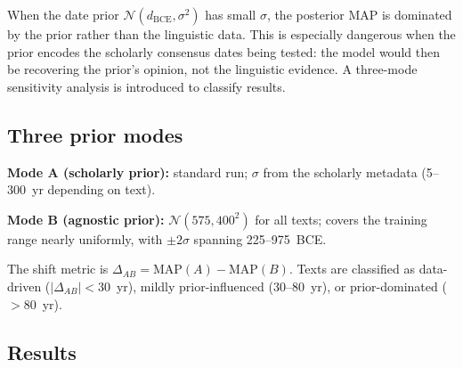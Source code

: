 \documentclass[10pt,letterpaper]{article}
\begin{document}
When the date prior $\mathcal{N}(d_{\text{BCE}}, \sigma^2)$ has small $\sigma$,
the posterior MAP is dominated by the prior rather than the linguistic data.
This is especially dangerous when the prior encodes the scholarly consensus
dates being tested: the model would then be recovering the prior's opinion,
not the linguistic evidence.  A three-mode sensitivity analysis is
introduced to classify results.

\subsection*{Three prior modes}

\textbf{Mode A (scholarly prior):} standard run; $\sigma$ from the
scholarly metadata (5--300~yr depending on text).

\textbf{Mode B (agnostic prior):} $\mathcal{N}(575, 400^2)$ for all texts;
covers the training range nearly uniformly, with $\pm 2\sigma$ spanning
225--975~BCE.

The shift metric is $\Delta_{AB} = \text{MAP}(A) - \text{MAP}(B)$.
Texts are classified as data-driven ($|\Delta_{AB}| < 30$~yr), mildly
prior-influenced (30--80~yr), or prior-dominated ($> 80$~yr).

\subsection*{Results}
\end{document}
